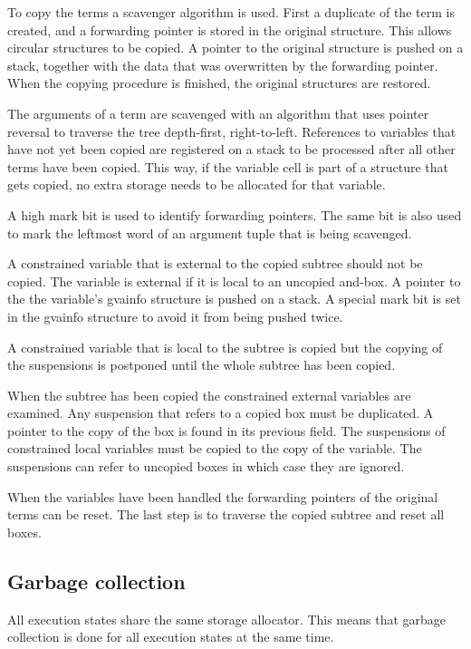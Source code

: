 To copy the terms a scavenger algorithm is used. First a duplicate of
the term is created, and a forwarding pointer is stored in the original
structure. This allows circular structures to be copied. A pointer to
the original structure is pushed on a stack, together with the data that
was overwritten by the forwarding pointer. When the copying procedure
is finished, the original structures are restored.

The arguments of a term are scavenged with an algorithm that uses
pointer reversal to traverse the tree depth-first, right-to-left.
References to variables that have not yet been copied are registered
on a stack to be processed after all other terms have been copied. This
way, if the variable cell is part of a structure that gets copied, no extra
storage needs to be allocated for that variable.

A high mark bit is used to identify forwarding pointers. The same bit is
also used to mark the leftmost word of an argument tuple that is being
scavenged.

A constrained variable that is external to the copied subtree should
not be copied. The variable is external if it is local to an uncopied
and-box. A pointer to the the variable's gvainfo structure is pushed on
a stack. A special mark bit is set in the gvainfo structure to avoid it
from being pushed twice.

A constrained variable that is local to the subtree is copied
but the copying of the suspensions is postponed until the whole
subtree has been copied.

When the subtree has been copied the constrained external variables
are examined.  Any suspension that refers to a copied box must be
duplicated. A pointer to the copy of the box is found in its previous
field. The suspensions of constrained local variables must be copied to
the copy of the variable. The suspensions can refer to uncopied boxes
in which case they are ignored.

When the variables have been handled the forwarding pointers of the original
terms can be reset. The last step is to traverse the copied subtree and reset
all boxes.


\subsection*{Garbage collection} \label{implgc}

All execution states share the same storage allocator. This means that
garbage collection is done for all execution states at the same time.

